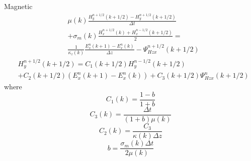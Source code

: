\documentclass[a4paper,10pt]{article}
\begin{document}
Magnetic
\begin{equation}
\begin{aligned}
&\mu(k)\frac{H^{n+1/2}_{y}(k+1/2)-H^{n+1/2}_{y}(k+1/2)}{\Delta t}\\
&+\sigma_m(k)\frac{H^{n+1/2}_{x}(k)+H^{n-1/2}_{x}(k+1/2)}{2}=\\
&\frac{1}{\kappa_z(k)}\frac{E^{n}_{x}(k+1)-E^{n}_{x}(k)}{\Delta z}-\Psi_{Hzx}^{n+1/2}(k+1/2)
\end{aligned}
\end{equation}
\begin{equation}
\begin{aligned}
&H^{n+1/2}_{y}(k+1/2)=C_{1}(k+1/2)H^{n-1/2}_{y}(k+1/2)\\
&+C_{2}(k+1/2)\left(E^{n}_{x}(k+1)-E^{n}_{x}(k)\right)+C_{3}(k+1/2)\Psi_{Hzx}^{n}(k+1/2)
\end{aligned}
\end{equation}
where 
\begin{equation}
C_{1}(k)=\frac{1-b}{1+b}
\end{equation}
\begin{equation}
C_{3}(k)=\frac{\Delta t}{(1+b)\mu(k)}
\end{equation}
\begin{equation}
C_{2}(k)=\frac{C_{3}}{\kappa(k)\Delta z}
\end{equation}
\begin{equation}
b=\frac{\sigma_m(k)\Delta t}{2\mu(k)}
\end{equation}
\end{document}
